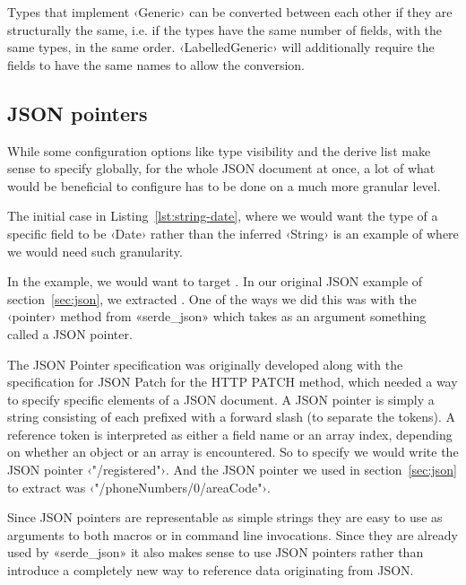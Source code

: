 Types that implement ‹Generic› can be converted between each other if they are structurally the same, i.e. if the types have the same number of fields, with the same types, in the same order. ‹LabelledGeneric› will additionally require the fields to have the same names to allow the conversion.

\subsection{JSON pointers}
\label{sec:json-pointers}

While some configuration options like type visibility and the derive list make sense to specify globally, for the whole JSON document at once, a lot of what would be beneficial to configure has to be done on a much more granular level.

The initial case in Listing~\ref{lst:string-date}, where we would want the type of a specific field to be ‹Date› rather than the inferred ‹String› is an example of where we would need such granularity.

In the example, we would want to target . In our original JSON example of section~\ref{sec:json}, we extracted . One of the ways we did this was with the ‹pointer› method from «serde_json» which takes as an argument something called a JSON pointer.

The JSON Pointer specification\cite{RFC6901} was originally developed along with the specification for JSON Patch\cite{RFC6902} for the HTTP PATCH method, which needed a way to specify specific elements of a JSON document. A JSON pointer is simply a string consisting of  each prefixed with a forward slash (to separate the tokens). A reference token is interpreted as either a field name or an array index, depending on whether an object or an array is encountered. So to specify  we would write the JSON pointer ‹"/registered"›. And the JSON pointer we used in section~\ref{sec:json} to extract  was ‹"/phoneNumbers/0/areaCode"›.

Since JSON pointers are representable as simple strings they are easy to use as arguments to both macros or in command line invocations. Since they are already used by «serde_json» it also makes sense to use JSON pointers rather than introduce a completely new way to reference data originating from JSON.

